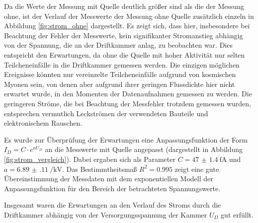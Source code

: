 Da die Werte der Messung mit Quelle deutlich größer sind als die der Messung ohne, ist der Verlauf der Messwerte der Messung ohne Quelle zusätzlich einzeln in Abbildung \ref{fig:strom_ohne} dargestellt. Es zeigt sich, dass hier, insbesondere bei Beachtung der Fehler der Messwerte, kein signifikanter Stromanstieg abhängig von der Spannung, die an der Driftkammer anlag, zu beobachten war. Dies entspricht den Erwartungen, da ohne die Quelle mit hoher Aktivität nur selten Teilcheneinfälle in die Driftkammer gemessen werden. Die einzigen möglichen Ereignisse könnten nur vereinzelte Teilcheneinfälle aufgrund von kosmischen Myonen sein, von denen aber aufgrund ihrer geringen Flussdichte hier nicht erwartet wurde, in den Momenten der Datenaufnahmen gemessen zu werden. Die geringeren Ströme, die bei Beachtung der Messfehler trotzdem gemessen wurden, entsprechen vermutlich Leckströmen der verwendeten Bauteile und elektronischem Rauschen.


Es wurde zur Überprüfung der Erwartungen eine Anpassungsfunktion der Form $I_D=C\cdot e^{a U_D}$ an die Messwerte mit Quelle angepasst (dargestellt in Abbildung \ref{fig:strom_vergleich}). Dabei ergaben sich als Parameter $C=\SI{47(1.4)}{\femto\A}$ und $a=\SI{6.89(11)}{\per\kilo\V}$. Das Bestimmtheitsmaß $R^2=\num{0.995}$ zeigt eine gute Übereinstimmung der Messdaten mit dem exponentiellen Modell der Anpassungsfunktion für den Bereich der betrachteten Spannungswerte.

Insgesamt waren die Erwartungen an den Verlauf des Stroms durch die Driftkammer abhängig von der Versorgungsspannung der Kammer $U_D$ gut erfüllt.
